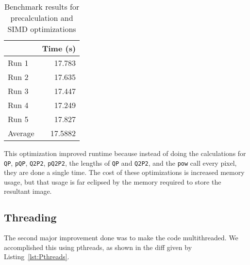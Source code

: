 \documentclass[12pt]{article}
\begin{document}

\begin{table}[H]
  \centering
  \begin{tabular}{lr}
    & {\bf Time (s)} \\
    \hline
    Run 1 & 17.783 \\
    Run 2 & 17.635 \\
    Run 3 & 17.447 \\
    Run 4 & 17.249 \\
    Run 5 & 17.827 \\
    \hline
    Average & 17.5882 \\
  \end{tabular}
  \caption{Benchmark results for precalculation and SIMD optimizations}
  \label{tbl-precalculation}
\end{table}

This optimization improved runtime because instead of doing the
calculations for \texttt{QP}, \texttt{pQP}, \texttt{Q2P2},
\texttt{pQ2P2}, the lengths of \texttt{QP} and \texttt{Q2P2}, and the
\texttt{pow} call every pixel, they are done a single time. The cost
of these optimizations is increased memory usage, but that usage is
far eclipsed by the memory required to store the resultant image.

\subsection*{Threading}

The second major improvement done was to make the code multithreaded. We accomplished this using pthreads, as shown in the diff given by Listing~\ref{lst:Pthreads}.
\end{document}
